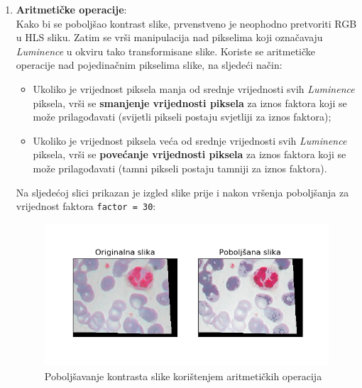 \documentclass[12pt,a4paper]{article}
\begin{document}
\begin{enumerate}

\item \textbf{Aritmetičke operacije}: \\

Kako bi se poboljšao kontrast slike, prvenstveno je neophodno pretvoriti RGB u HLS sliku. Zatim se vrši manipulacija nad pikselima koji označavaju \textit{Luminence} u okviru tako transformisane slike. Koriste se aritmetičke operacije nad pojedinačnim pikselima slike, na sljedeći način:

\begin{itemize}

\item Ukoliko je vrijednost piksela manja od srednje vrijednosti svih \textit{Luminence} piksela, vrši se \textbf{smanjenje vrijednosti piksela} za iznos faktora koji se može prilagođavati (svijetli pikseli postaju svjetliji za iznos faktora);
\item Ukoliko je vrijednost piksela veća od srednje vrijednosti svih \textit{Luminence} piksela, vrši se \textbf{povećanje vrijednosti piksela} za iznos faktora koji se može prilagođavati (tamni pikseli postaju tamniji za iznos faktora).

\end{itemize}

Na sljedećoj slici prikazan je izgled slike prije i nakon vršenja poboljšanja za vrijednost faktora \texttt{factor = 30}:

\begin{figure}[H]

\center
\includegraphics[scale=0.9]{s3Kontrast1.png}
\caption{Poboljšavanje kontrasta slike korištenjem aritmetičkih operacija}

\end{figure}

\newpage


\end{enumerate}
\end{document}
